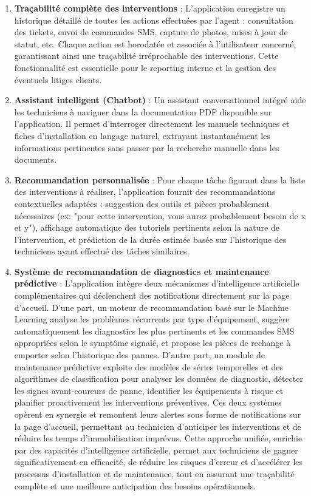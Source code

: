 \documentclass[12pt,a4paper]{report}
\begin{document}
\begin{enumerate}
     \item \textbf{Traçabilité complète des interventions } : L'application enregistre un historique détaillé de toutes les actions effectuées par l'agent : consultation des tickets, envoi de commandes SMS, capture de photos, mises à jour de statut, etc. Chaque action est horodatée et associée à l'utilisateur concerné, garantissant ainsi une traçabilité irréprochable des interventions. Cette fonctionnalité est essentielle pour le reporting interne et la gestion des éventuels litiges clients.
     \item \textbf{Assistant intelligent (Chatbot)} :
     Un assistant conversationnel intégré aide les techniciens à naviguer dans la documentation PDF disponible sur l'application. Il permet d'interroger directement les manuels techniques et fiches d'installation en langage naturel, extrayant instantanément les informations pertinentes sans passer par la recherche manuelle dans les documents.
     \item \textbf{Recommandation personnalisée} :
     Pour chaque tâche figurant dans la liste des interventions à réaliser, l'application fournit des recommandations contextuelles adaptées : suggestion des outils et pièces probablement nécessaires (ex: "pour cette intervention, vous aurez probablement besoin de x et y"), affichage automatique des tutoriels pertinents selon la nature de l'intervention, et prédiction de la durée estimée basée sur l'historique des techniciens ayant effectué des tâches similaires.
     \item \textbf{Système de recommandation de diagnostics et maintenance prédictive } :
     L'application intègre deux mécanismes d’intelligence artificielle complémentaires qui déclenchent des notifications directement sur la page d'accueil. D'une part, un moteur de recommandation basé sur le Machine Learning analyse les problèmes récurrents par type d'équipement, suggère automatiquement les diagnostics les plus pertinents et les commandes SMS appropriées selon le symptôme signalé, et propose les pièces de rechange à emporter selon l'historique des pannes. D'autre part, un module de maintenance prédictive exploite des modèles de séries temporelles et des algorithmes de classification pour analyser les données de diagnostic, détecter les signes avant-coureurs de panne, identifier les équipements à risque et planifier proactivement les interventions préventives. Ces deux systèmes opèrent en synergie et remontent leurs alertes sous forme de notifications sur la page d'accueil, permettant au technicien d'anticiper les interventions et de réduire les temps d'immobilisation imprévus.
     \noindent Cette approche unifiée, enrichie par des capacités d'intelligence artificielle, permet aux techniciens de gagner significativement en efficacité, de réduire les risques d'erreur et d'accélérer les processus d'installation et de maintenance, tout en assurant une traçabilité complète et une meilleure anticipation des besoins opérationnels.
 \end{enumerate}
\end{document}
